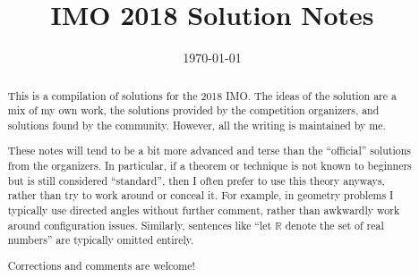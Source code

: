 \documentclass[11pt]{scrartcl}
\title{IMO 2018 Solution Notes}
\date{\today}
\begin{document}
\maketitle

\begin{abstract}
This is a compilation of solutions
for the 2018 IMO.
The ideas of the solution are a mix of my own work,
the solutions provided by the competition organizers,
and solutions found by the community.
However, all the writing is maintained by me.

These notes will tend to be a bit more advanced and terse than the ``official''
solutions from the organizers.
In particular, if a theorem or technique is not known to beginners
but is still considered ``standard'', then I often prefer to
use this theory anyways, rather than try to work around or conceal it.
For example, in geometry problems I typically use directed angles
without further comment, rather than awkwardly work around configuration issues.
Similarly, sentences like ``let $\mathbb{R}$ denote the set of real numbers''
are typically omitted entirely.

Corrections and comments are welcome!
\end{abstract}

\tableofcontents
\newpage

\addtocounter{section}{-1}
\end{document}
